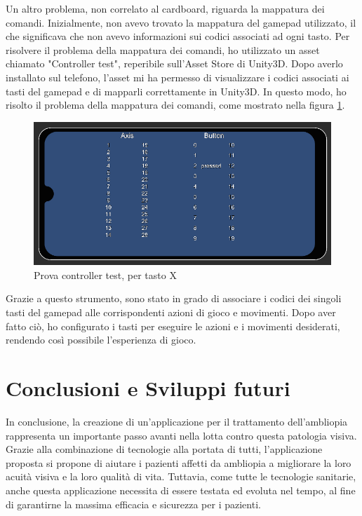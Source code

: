 \documentclass[
a4paper,
cleardoublepage=empty,
headings=twolinechapter,
numbers=autoenddot,
]{scrbook}
\begin{document}
    Un altro problema, non correlato al cardboard, riguarda la mappatura dei comandi. Inizialmente, non avevo trovato la mappatura del gamepad utilizzato, il che significava che non avevo informazioni sui codici associati ad ogni tasto.
    Per risolvere il problema della mappatura dei comandi, ho utilizzato un asset chiamato "Controller test"\cite{Controller_test}, reperibile sull'Asset Store di Unity3D. Dopo averlo installato sul telefono, l'asset mi ha permesso di visualizzare i codici associati ai tasti del gamepad e di mapparli correttamente in Unity3D. In questo modo, ho risolto il problema della mappatura dei comandi, come mostrato nella figura \ref{fig:controller_test}.
    \begin{figure}[H]
    	\centering
    	\includegraphics[width=0.7\linewidth]{image/controller_test}
    	\caption{Prova controller test, per tasto X}
    	\label{fig:controller_test}
    \end{figure}
    Grazie a questo strumento, sono stato in grado di associare i codici dei singoli tasti del gamepad alle corrispondenti azioni di gioco e movimenti. Dopo aver fatto ciò, ho configurato i tasti per eseguire le azioni e i movimenti desiderati, rendendo così possibile l'esperienza di gioco.
    \chapter{Conclusioni e Sviluppi futuri}
   In conclusione, la creazione di un'applicazione per il trattamento dell'ambliopia rappresenta un importante passo avanti nella lotta contro questa patologia visiva. Grazie alla combinazione di tecnologie alla portata di tutti, l'applicazione proposta si propone di aiutare i pazienti affetti da ambliopia a migliorare la loro acuità visiva e la loro qualità di vita. Tuttavia, come tutte le tecnologie sanitarie, anche questa applicazione necessita di essere testata ed evoluta nel tempo, al fine di garantirne la massima efficacia e sicurezza per i pazienti.\\\\
   
\end{document}
